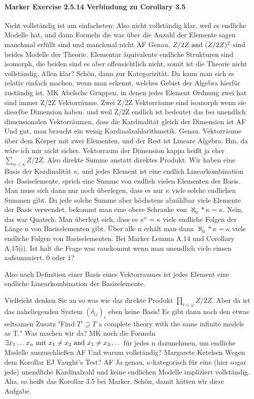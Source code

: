\paragraph*{Marker Exercise 2.5.14 Verbindung zu Corollary 3.5}
Nicht vollständig ist am einfachsten:
Also nicht vollständig klar, weil es endliche Modelle hat, und dann Formeln die was über die Anzahl der Elemente sagen manchmal erfüllt sind und manchmal nicht
AF
Genau, $Z/2Z \text{ and } (Z/2Z)^2$ sind beides Modelle der Theorie. Elementar äquivalente endliche Strukturen sind isomorph, die beiden sind es aber offensichtlich nicht, somit ist die Theorie nicht vollständig.
Allen klar? Schön, dann zur Kategorizität. Da kann man sich es relativ einfach machen, wenn man erkennt, welches Gebiet der Algebra hierfür zuständig ist.
MK
Abelsche Gruppen, in denen jedes Element Ordnung zwei hat sind immer Z/2Z Vektorräume. Zwei Z/2Z Vektorräume sind isomorph wenn sie dieselbe Dimension haben. und weil Z/2Z endlich ist bedeutet das bei unendlich dimensionalen Vektorräumen, dass die Kardinalität gleich der Dimension ist
AF
Und gut, man braucht ein wenig Kardinalzahlarithmetik.
Genau. Vektorräume über dem Körper mit zwei Elementen, und der Rest ist Lineare Algebra.
Hm, da wäre ich mir nicht sicher. Vektorraum der Dimension kappa heißt ja eher $\sum_{\alpha<\kappa}Z/2Z$. Also direkte Summe anstatt direktes Produkt.
Wir haben eine Basis der Kardinalität $\kappa$, und jedes Element ist eine endlich Linearkombination der Basiselemente, sprich eine Summe von endlich vielen Elementen der Basis.
Man muss sich dann nur noch überlegen, dass es nur $\kappa$ viele solche endlichen Summen gibt. 
Da jede solche Summe aber höchstens abzählbar viele Elemente der Basis verwendet, bekommt man eine obere Schranke von $\aleph_0*\kappa=\kappa.$
Nein, das war Quatsch.
Man überlegt sich, dass es $\kappa^n=\kappa$ viele endliche Folgen  der Länge n von Basiselementen gibt. Über alle n erhält man dann $\aleph_0*\kappa=\kappa$ viele endliche Folgen von Basiselementen. Bei Marker Lemma A.14 und Corollary A.15(i).
Ist halt die Frage was rauskommt wenn man unendlich viele einsen aufsummiert. 0 oder 1?

Also nach Definition einer Basis eines Vektorraumes ist jedes Element eine endliche Linearkombination der Basiselemente.

Vielleicht denken Sie an so was wie das direkte Produkt $\prod_{i<\omega}Z/2Z$. Aber da ist das naheliegenden System $(\delta_{ij})_i$ eben keine Basis!
Es gibt dann noch den etwas seltsamen Zusatz "Find $T'\supseteq T$ a complete theory with the same infinite models as T."
Was machen wir da?
MK
noch die Formeln
$\exists x_1\dots x_n \text{ mit } x_1\neq x_2 \text{ and } x_1 \neq x_3 \dots$
für jedes n dazunehmen, um endliche Modelle auszuschließen
AF
Und warum vollständig?
Margarete Ketelsen
Wegen dem Korollar
EJ
Vaught's Test?
AF
Ja genau, $\kappa$-kategorisch für eine (hier sogar jede) unendliche Kardinalzahl und keine endlichen Modelle impliziert vollständig. Aha, so heißt das Korollar 3.5 bei Marker. Schön, damit hätten wir diese Aufgabe.